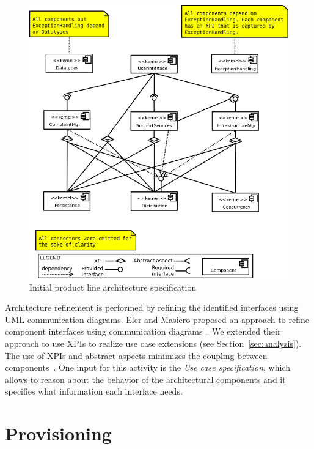 \documentclass[11pt,twoside]{article}
\begin{document}
\begin{figure}[h!t!b!]
   \centering
    \includegraphics[scale=0.35]{figs/phc-pla-v01.png}
   \caption{Initial product line architecture specification}
   \label{fig:initialArch}
\end{figure}

Architecture refinement is performed by refining the identified interfaces using UML communication diagrams. Eler and Masiero proposed an approach to
refine component interfaces
using communication diagrams~\cite{Eler:2006:AC}. We extended their approach to use XPIs to realize use case extensions (see
Section~\ref{sec:analysis}). The use of XPIs and
abstract aspects minimizes the coupling between components~\cite{Dias:2010:LAC}. One input for this activity is the \textit{Use case specification},
which allows to reason about
the behavior of the architectural components and it specifies what information each interface needs. 



\section{Provisioning}
\end{document}
